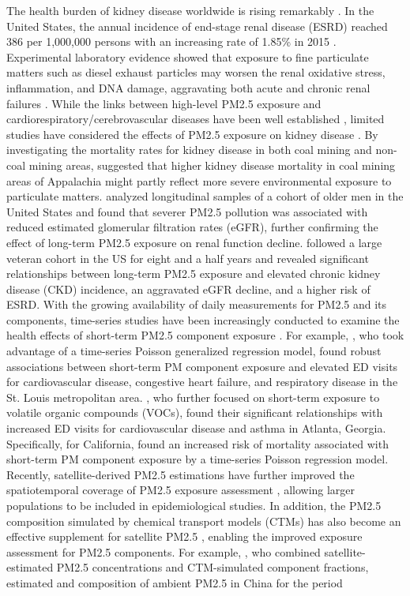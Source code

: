 \documentclass[11pt]{article}
\begin{document}
The health burden of kidney disease worldwide is rising remarkably \citep{Lysaght2002}. In the United States, the annual incidence of end-stage renal disease (ESRD) reached 386 per 1,000,000 persons with an increasing rate of 1.85\% in 2015 \citep{Saran2018}. Experimental laboratory evidence showed that exposure to fine particulate matters such as diesel exhaust particles may worsen the renal oxidative stress, inflammation, and DNA damage, aggravating both acute and chronic renal failures \citep{Nemmar2009, Nemmar2016}. While the links between high-level PM2.5 exposure and cardiorespiratory/cerebrovascular diseases have been well established \citep{Delfino2010, Suh2011, Kioumourtzoglou2013, Sarnat2015, Ye2017}, limited studies have considered the effects of PM2.5 exposure on kidney disease \citep{Hendryx2009, Mehta2016, Xu2016, Bowe2018}. By investigating the mortality rates for kidney disease in both coal mining and non-coal mining areas, \citet{Hendryx2009} suggested that higher kidney disease mortality in coal mining areas of Appalachia might partly reflect more severe environmental exposure to particulate matters. \citet{Mehta2016} analyzed longitudinal samples of a cohort of older men in the United States and found that severer PM2.5 pollution was associated with reduced estimated glomerular filtration rates (eGFR), further confirming the effect of long-term PM2.5 exposure on renal function decline. \citet{Bowe2018} followed a large veteran cohort in the US for eight and a half years and revealed significant relationships between long-term PM2.5 exposure and elevated chronic kidney disease (CKD) incidence, an aggravated eGFR decline, and a higher risk of ESRD. With the growing availability of daily measurements for PM2.5 and its components, time-series studies have been increasingly conducted to examine the health effects of short-term PM2.5 component exposure \citep{Ostro2007, Gass2015, Sarnat2015, Ye2017}. For example, \citet{Sarnat2015}, who took advantage of a time-series Poisson generalized regression model, found robust associations between short-term PM component exposure and elevated ED visits for cardiovascular disease, congestive heart failure, and respiratory disease in the St. Louis metropolitan area. \citet{Ye2017}, who further focused on short-term exposure to volatile organic compounds (VOCs), found their significant relationships with increased ED visits for cardiovascular disease and asthma in Atlanta, Georgia. Specifically, for California, \citet{Ostro2007} found an increased risk of mortality associated with short-term PM component exposure by a time-series Poisson regression model. Recently, satellite-derived PM2.5 estimations have further improved the spatiotemporal coverage of PM2.5 exposure assessment \citep{Hu2017, Xiao2017}, allowing larger populations to be included in epidemiological studies. In addition, the PM2.5 composition simulated by chemical transport models (CTMs) has also become an effective supplement for satellite PM2.5 \citep{Philip2014, Geng2015, Si2017}, enabling the improved exposure assessment for PM2.5 components. For example, \citet{Si2017}, who combined satellite-estimated PM2.5 concentrations and CTM-simulated component fractions, estimated  and  composition of ambient PM2.5 in China for the period 
\end{document}
